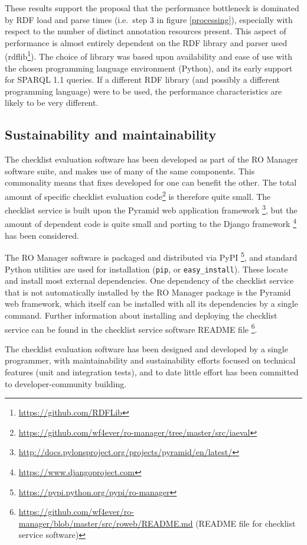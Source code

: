 These results support the proposal that the performance bottleneck is
dominated by RDF load and parse times (i.e.~step 3 in figure
\ref{processing}), especially with respect to the number of distinct
annotation resources present. This aspect of performance is almost
entirely dependent on the RDF library and parser used (rdflib\footnote{\url{https://github.com/RDFLib}}).
The choice of library was based upon availability and ease of use with
the chosen programming language environment (Python), and its early
support for SPARQL 1.1 queries. If a different RDF library (and possibly
a different programming language) were to be used, the performance
characteristics are likely to be very different.

\pagebreak [3]

\subsection{Sustainability and maintainability}

The checklist evaluation software has been developed as part of the RO
Manager software suite, and makes use of many of the same components.
This commonality means that fixes developed for one can benefit the
other. The total amount of specific checklist evaluation code\footnote{\url{https://github.com/wf4ever/ro-manager/tree/master/src/iaeval}}
is therefore quite small. The checklist service is built upon the
Pyramid web application framework \footnote{\url{http://docs.pylonsproject.org/projects/pyramid/en/latest/}},
but the amount of dependent code is quite small and porting to the
Django framework \footnote{\url{https://www.djangoproject.com}} has been
considered.

The RO Manager software is packaged and distributed via PyPI \footnote{\url{https://pypi.python.org/pypi/ro-manager}},
and standard Python utilities are used for installation (\texttt{pip},
or \texttt{easy\_install}). These locate and install most external
dependencies. One dependency of the checklist service that is not
automatically installed by the RO Manager package is the Pyramid web
framework, which itself can be installed with all its dependencies by a
single command. Further information about installing and deploying the
checklist service can be found in the checklist service software README
file \footnote{\url{https://github.com/wf4ever/ro-manager/blob/master/src/roweb/README.md}
  (README file for checklist service software)}.

The checklist evaluation software has been designed and developed by a
single programmer, with maintainability and sustainability efforts
focused on technical features (unit and integration tests), and to date
little effort has been committed to developer-community building.

